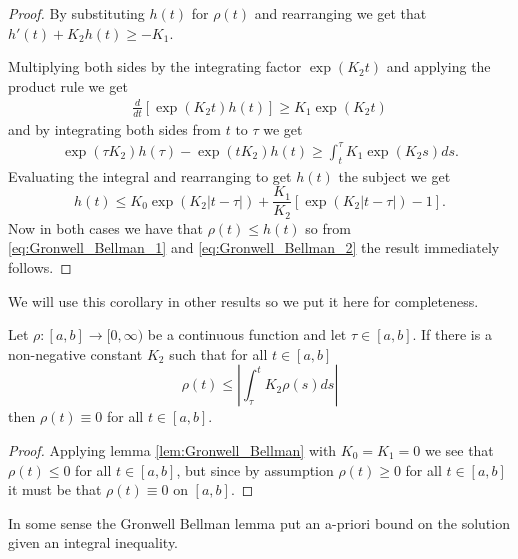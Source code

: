 \documentclass{unswmaths}
\begin{document}
\begin{proof}
By substituting $ h(t) $ for $ \rho(t) $ and rearranging we get that
$ h'(t) +K_2h(t) \geq -K_1 $.

Multiplying both sides by the integrating factor $ \exp(K_2t) $ and applying the 
product rule we get 
\begin{align*}
	\frac{d}{dt}\left[ \exp(K_2t)h(t) \right] \geq K_1\exp(K_2t)
\end{align*}
and by integrating both sides from $ t \text{ to } \tau $ we get
\begin{align*}
	\exp(\tau K_2)h(\tau) - \exp(tK_2)h(t) \geq \int_t^\tau K_1 \exp(K_2s)ds.
\end{align*}
Evaluating the integral and rearranging to get $ h(t) $ the subject we get
\begin{equation}
\label{eq:Gronwell_Bellman_2}
	h(t) \leq K_0\exp(K_2|t - \tau|) + \frac{K_1}{K_2}\left[\exp(K_2|t-\tau|) - 1\right].
\end{equation}
Now in both cases we have that $ \rho(t) \leq h(t) $ so from 
\eqref{eq:Gronwell_Bellman_1} and \eqref{eq:Gronwell_Bellman_2} the result immediately follows.
\end{proof}
We will use this corollary in other results so we put it here for completeness.
\begin{unswcor}
\label{cor:Gronwell_Bellman}
Let $ \rho : [a,b] \longrightarrow [0, \infty) $ be a continuous function and
let $ \tau \in [a,b] $. If there is a non-negative constant $ K_2 $ such that for
all $ t \in [a,b] $
$$
	\rho(t) \leq | \int_\tau^t K_2 \rho(s) ds |
$$
then $ \rho(t) \equiv 0 $ for all $ t \in [a, b] $.
\end{unswcor}
\begin{proof}
Applying lemma \ref{lem:Gronwell_Bellman} with $ K_0 = K_1 = 0 $ we see that
$ \rho(t) \leq 0 $ for all $ t \in [a,b] $, but since by assumption $ \rho(t) \geq 0 $ 
for all $ t \in [a, b] $ it must be that $ \rho(t) \equiv 0 $ on $ [a, b] $.	
\end{proof}

In some sense the Gronwell Bellman lemma put an a-priori bound on the solution
given an integral inequality.
\end{document}
